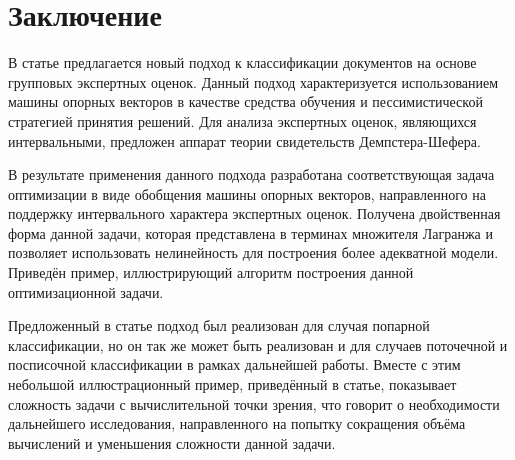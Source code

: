 \documentclass[12pt,a4paper,oneside]{article}
\begin{document}
\section{Заключение}
\label{sec:conclusions}

\par
В статье предлагается новый подход к классификации документов на основе групповых экспертных оценок.
Данный подход характеризуется использованием машины опорных векторов в качестве средства обучения и пессимистической стратегией принятия решений. 
Для анализа экспертных оценок, являющихся интервальными, предложен аппарат теории свидетельств Демпстера-Шефера. 
\par
В результате применения данного подхода разработана соответствующая задача оптимизации в виде обобщения машины опорных векторов, направленного на поддержку интервального характера экспертных оценок. 
Получена двойственная форма данной задачи, которая представлена в терминах множителя Лагранжа и позволяет использовать нелинейность для построения более адекватной модели. 
Приведён пример, иллюстрирующий алгоритм построения данной оптимизационной задачи. 
\par
Предложенный в статье подход был реализован для случая попарной классификации, но он так же может быть реализован и для случаев поточечной и посписочной классификации в рамках дальнейшей работы. 
Вместе с этим небольшой иллюстрационный пример, приведённый в статье, показывает сложность задачи с вычислительной точки зрения, что говорит о необходимости дальнейшего исследования, направленного на попытку сокращения объёма вычислений и уменьшения сложности данной задачи. 

\end{document}
